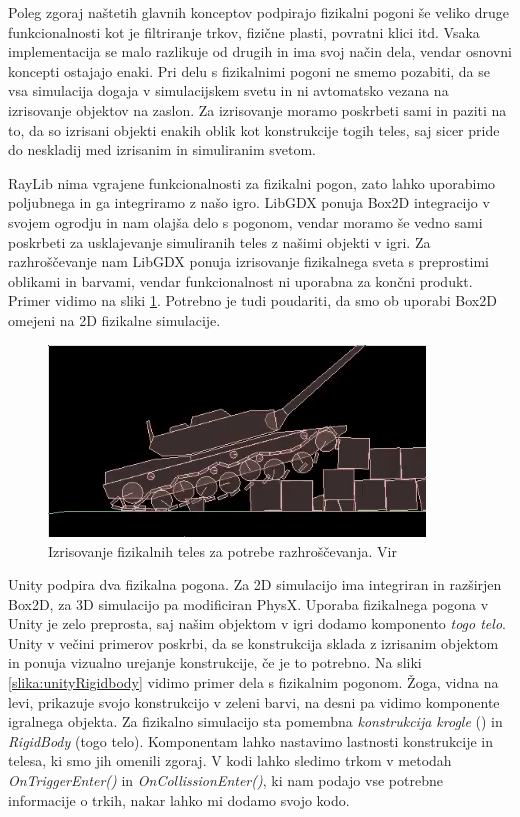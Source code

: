 \documentclass[12pt,a4paper,twoside]{book}
\begin{document}
Poleg zgoraj naštetih glavnih konceptov podpirajo fizikalni pogoni še veliko druge funkcionalnosti kot je filtriranje trkov, fizične plasti, povratni klici itd. Vsaka implementacija se malo razlikuje od drugih in ima svoj način dela, vendar osnovni koncepti ostajajo enaki. Pri delu s fizikalnimi pogoni ne smemo pozabiti, da se vsa simulacija dogaja v simulacijskem svetu in ni avtomatsko vezana na izrisovanje objektov na zaslon. Za izrisovanje moramo poskrbeti sami in paziti na to, da so izrisani objekti enakih oblik kot konstrukcije togih teles, saj sicer pride do neskladij med izrisanim in simuliranim svetom.

RayLib nima vgrajene funkcionalnosti za fizikalni pogon, zato lahko uporabimo poljubnega in ga integriramo z našo igro. LibGDX ponuja Box2D integracijo v svojem ogrodju in nam olajša delo s pogonom, vendar moramo še vedno sami poskrbeti za usklajevanje simuliranih teles z našimi objekti v igri. Za razhroščevanje nam LibGDX ponuja izrisovanje fizikalnega sveta s preprostimi oblikami in barvami, vendar funkcionalnost ni uporabna za končni produkt. Primer vidimo na sliki \ref{slika:box2dDebug}. Potrebno je tudi poudariti, da smo ob uporabi Box2D omejeni na 2D fizikalne simulacije.

\begin{figure}[h]
	\centering
	\includegraphics[width=10cm]{box2dDebug}
	\caption{Izrisovanje fizikalnih teles za potrebe razhroščevanja. Vir \cite{box2dTank}}
	\label{slika:box2dDebug}
\end{figure}

Unity podpira dva fizikalna pogona. Za 2D simulacijo ima integriran in razširjen Box2D, za 3D simulacijo pa modificiran PhysX. Uporaba fizikalnega pogona v Unity je zelo preprosta, saj našim objektom v igri dodamo komponento \textit{togo telo}. Unity v večini primerov poskrbi, da se konstrukcija sklada z izrisanim objektom in ponuja vizualno urejanje konstrukcije, če je to potrebno. Na sliki \ref{slika:unityRigidbody} vidimo primer dela s fizikalnim pogonom. Žoga, vidna na levi, prikazuje svojo konstrukcijo v zeleni barvi, na desni pa vidimo komponente igralnega objekta. Za fizikalno simulacijo sta pomembna \textit{konstrukcija krogle} () in \textit{RigidBody} (togo telo). Komponentam lahko nastavimo lastnosti konstrukcije in telesa, ki smo jih omenili zgoraj. V kodi lahko sledimo trkom v metodah \textit{OnTriggerEnter()} in \textit{OnCollissionEnter()}, ki nam podajo vse potrebne informacije o trkih, nakar lahko mi dodamo svojo kodo.
\end{document}
